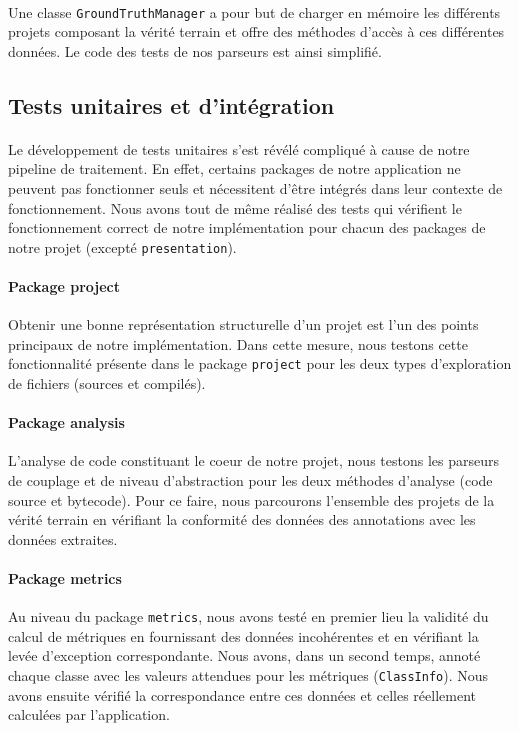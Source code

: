 \documentclass{scrartcl}
\begin{document}
    \paragraph{}Une classe \texttt{GroundTruthManager} a pour but de charger en mémoire les différents projets composant la vérité terrain et offre des méthodes d'accès à ces différentes données. Le code des tests de nos parseurs est ainsi simplifié.

\subsection{Tests unitaires et d'intégration}

    \paragraph{}Le développement de tests unitaires s'est révélé compliqué à cause de notre pipeline de traitement. En effet, certains packages de notre application ne peuvent pas fonctionner seuls et nécessitent d'être intégrés dans leur contexte de fonctionnement. Nous avons tout de même réalisé des tests qui vérifient le fonctionnement correct de notre implémentation pour chacun des packages de notre projet (excepté \texttt{presentation}).
    
    \paragraph{Package project}Obtenir une bonne représentation structurelle d'un projet est l'un des points principaux de notre implémentation. Dans cette mesure, nous testons cette fonctionnalité présente dans le package \texttt{project} pour les deux types d'exploration de fichiers (sources et compilés).
    
    \paragraph{Package analysis}L'analyse de code constituant le coeur de notre projet, nous testons les parseurs de couplage et de niveau d'abstraction pour les deux méthodes d'analyse (code source et bytecode). Pour ce faire, nous parcourons l'ensemble des projets de la vérité terrain en vérifiant la conformité des données des annotations avec les données extraites. 
    
    \paragraph{Package metrics}Au niveau du package \texttt{metrics}, nous avons testé en premier lieu la validité du calcul de métriques en fournissant des données incohérentes et en vérifiant la levée d'exception correspondante. Nous avons, dans un second temps, annoté chaque classe avec les valeurs attendues pour les métriques (\texttt{ClassInfo}). Nous avons ensuite vérifié la correspondance entre ces données et celles réellement calculées par l'application.
    
\end{document}
